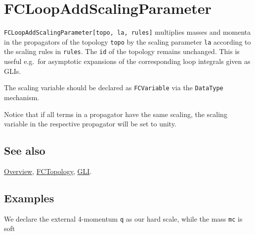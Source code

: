 \documentclass[../FeynCalcManual.tex]{subfiles}
\begin{document}
\hypertarget{fcloopaddscalingparameter}{
\section{FCLoopAddScalingParameter}\label{fcloopaddscalingparameter}}

\texttt{FCLoopAddScalingParameter[\allowbreak{}topo,\ \allowbreak{}la,\ \allowbreak{}rules]}
multiplies masses and momenta in the propagators of the topology
\texttt{topo} by the scaling parameter \texttt{la} according to the
scaling rules in \texttt{rules}. The \texttt{id} of the topology remains
unchanged. This is useful e.g.~for asymptotic expansions of the
corresponding loop integrals given as GLIs.

The scaling variable should be declared as \texttt{FCVariable} via the
\texttt{DataType} mechanism.

Notice that if all terms in a propagator have the same scaling, the
scaling variable in the respective propagator will be set to unity.

\subsection{See also}

\hyperlink{toc}{Overview}, \hyperlink{fctopology}{FCTopology},
\hyperlink{gli}{GLI}.

\subsection{Examples}

\begin{Shaded}
\begin{Highlighting}[]
\OperatorTok{[}\OperatorTok{,}\OperatorTok{]} \ExtensionTok{=} \NormalTok{;}
\end{Highlighting}
\end{Shaded}

We declare the external 4-momentum \texttt{q} as our hard scale, while
the mass \texttt{mc} is soft
\end{document}
